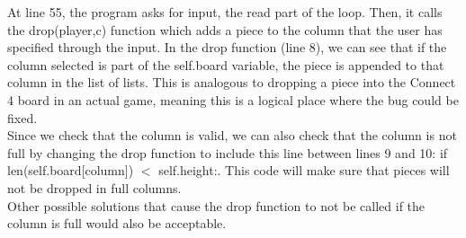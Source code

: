 At line 55, the program asks for input, the read part of the loop.
Then, it calls the drop(player,c) function which adds a piece to the column that the user has specified through the input.
In the drop function (line 8), we can see that if the column selected is part of the self.board variable,
	the piece is appended to that column in the list of lists.
This is analogous to dropping a piece into the Connect 4 board in an actual game, meaning this is a logical place where the bug could be fixed.\\

Since we check that the column is valid,
we can also check that the column is not full by changing the drop function to include this line between lines 9 and 10:
if len(self.board[column]) $<$ self.height:.
This code will make sure that pieces will not be dropped in full columns.\\

Other possible solutions that cause the drop function to not be called if the column is full would also be acceptable.

\newpage
